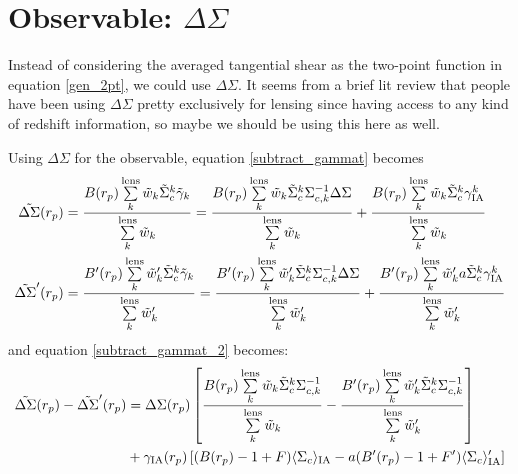 \documentclass[onecolumn,amsmath,aps,fleqn, superscriptaddress]{revtex4}
\begin{document}
\section*{Observable: $\Delta \Sigma$}

Instead of considering the averaged tangential shear as the two-point function in equation \ref{gen_2pt}, we could use $\Delta \Sigma$. It seems from a brief lit review that people have been using $\Delta \Sigma$ pretty exclusively for lensing since having access to any kind of redshift information, so maybe we should be using this here as well.

Using $\Delta \Sigma$ for the observable, equation \ref{subtract_gammat} becomes
\begin{align}
\tilde{\Delta \Sigma}(r_p) &= \frac{B(r_p) \sum\limits_{k}^{\rm lens} \tilde{w}_k \tilde{\Sigma}_c^k\tilde{\gamma}_k}{\sum\limits_{k}^{\rm lens} \tilde{w}_k} = \frac{B(r_p) \sum\limits_{k}^{\rm lens} \tilde{w}_k \tilde{\Sigma}_c^k \Sigma_{c,k}^{-1}\Delta\Sigma}{\sum\limits_{k}^{\rm lens} \tilde{w}_k}+\frac{B(r_p) \sum\limits_{k}^{\rm lens} \tilde{w}_k \tilde{\Sigma}_c^k \gamma_{\rm IA}^k}{\sum\limits_{k}^{\rm lens} \tilde{w}_k} \nonumber \\ 
\tilde{\Delta\Sigma}^\prime(r_p) &= \frac{B^\prime(r_p) \sum\limits_{k}^{\rm lens} \tilde{w}^\prime_k \tilde{\Sigma}_c^k\tilde{\gamma}_k}{\sum\limits_{k}^{\rm lens} \tilde{w}^\prime_k} = \frac{B^\prime(r_p) \sum\limits_{k}^{\rm lens} \tilde{w}^\prime_k \tilde{\Sigma}_c^k \Sigma_{c,k}^{-1}\Delta\Sigma}{\sum\limits_{k}^{\rm lens} \tilde{w}^\prime_k}+\frac{B^\prime(r_p) \sum\limits_{k}^{\rm lens} \tilde{w}^\prime_k a \tilde{\Sigma}_c^k\gamma_{\rm IA}^k}{\sum\limits_{k}^{\rm lens} \tilde{w}^\prime_k} 
\label{full_both_Delta_Sigma}
\end{align}
and equation \ref{subtract_gammat_2} becomes:
\begin{align}
\tilde{\Delta \Sigma}(r_p) - \tilde{\Delta\Sigma}^\prime(r_p) &= \Delta \Sigma(r_p)\left[\frac{B(r_p) \sum\limits_{k}^{\rm lens} \tilde{w}_k \tilde{\Sigma}_c^k\Sigma_{c,k}^{-1}}{\sum\limits_{k}^{\rm lens} \tilde{w}_k} - \frac{B^\prime(r_p) \sum\limits_{k}^{\rm lens} \tilde{w}^\prime_k \tilde{\Sigma}_c^k\Sigma_{c,k}^{-1}}{\sum\limits_{k}^{\rm lens} \tilde{w}^\prime_k}\right] \nonumber \\ &+\gamma_{\rm IA}(r_p) \left[(B(r_p)-1+F)\langle \Sigma_c \rangle_{\rm IA}-a(B^\prime(r_p)-1+F^\prime)\langle \Sigma_c \rangle_{\rm IA}^\prime \right]
\label{subtract_deltaS}
\end{align}
\end{document}
